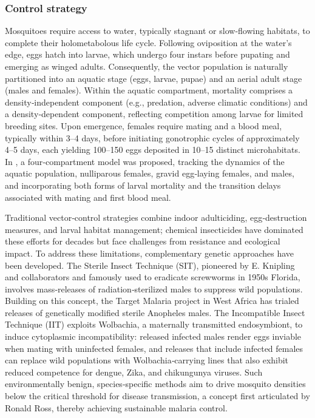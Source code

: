 \documentclass[10pt, a4paper]{amsart}
\theoremstyle{plain}
\theoremstyle{definition}
\theoremstyle{remark}
\numberwithin{equation}{section}
\begin{document}
\subsubsection{\bf Control strategy}\label{s31}
Mosquitoes require access to water, typically stagnant or slow‐flowing habitats, to complete their holometabolous life cycle. Following oviposition at the water’s edge, eggs hatch into larvae, which undergo four instars before pupating and emerging as winged adults. Consequently, the vector population is naturally partitioned into an aquatic stage (eggs, larvae, pupae) and an aerial adult stage (males and females). Within the aquatic compartment, mortality comprises a density‐independent component (e.g., predation, adverse climatic conditions) and a density‐dependent component, reflecting competition among larvae for limited breeding sites. Upon emergence, females require mating and a blood meal, typically within 3–4 days, before initiating gonotrophic cycles of approximately 4–5 days, each yielding 100–150 eggs deposited in 10–15 distinct microhabitats. In \cite{ref41}, a four‐compartment model was proposed, tracking the dynamics of the aquatic population, nulliparous females, gravid egg‐laying females, and males, and incorporating both forms of larval mortality and the transition delays associated with mating and first blood meal.

Traditional vector‐control strategies combine indoor adulticiding, egg‐destruction measures, and larval habitat management; chemical insecticides have dominated these efforts for decades but face challenges from resistance and ecological impact. To address these limitations, complementary genetic approaches have been developed. The Sterile Insect Technique (SIT), pioneered by E. Knipling and collaborators and famously used to eradicate screwworms in 1950s Florida, involves mass‐releases of radiation‐sterilized males to suppress wild populations. Building on this concept, the Target Malaria project in West Africa has trialed releases of genetically modified sterile Anopheles males. The Incompatible Insect Technique (IIT) exploits Wolbachia, a maternally transmitted endosymbiont, to induce cytoplasmic incompatibility: released infected males render eggs inviable when mating with uninfected females, and releases that include infected females can replace wild populations with Wolbachia‐carrying lines that also exhibit reduced competence for dengue, Zika, and chikungunya viruses. Such environmentally benign, species‐specific methods aim to drive mosquito densities below the critical threshold for disease transmission, a concept first articulated by Ronald Ross, thereby achieving sustainable malaria control.
  
\end{document}

